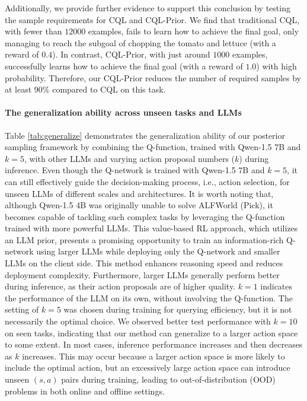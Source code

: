 \documentclass{article} %
\theoremstyle{plain}
\theoremstyle{definition}
\theoremstyle{remark}
\begin{document}
{Additionally, we provide further evidence to support this conclusion by testing the sample requirements for CQL and CQL-Prior. We find that traditional CQL, with fewer than $12000$ examples, fails to learn how to achieve the final goal, only managing to reach the subgoal of chopping the tomato and lettuce (with a reward of $0.4$). In contrast, CQL-Prior, with just around $1000$ examples, successfully learns how to achieve the final goal (with a reward of $1.0$) with high probability. Therefore, our CQL-Prior reduces the number of required samples by at least 90\% compared to CQL on this task.
\paragraph{The generalization ability across unseen tasks and LLMs} Table \ref{tab:generalize} demonstrates the generalization ability of our posterior sampling framework by combining the Q-function, trained with Qwen-1.5 7B and $k=5$, with other LLMs and varying action proposal numbers ($k$) during inference. Even though the Q-network is trained with Qwen-1.5 7B and $k=5$, it can still effectively guide the decision-making process, i.e., action selection, for unseen LLMs of different scales and architectures. It is worth noting that, although Qwen-1.5 4B was originally unable to solve ALFWorld (Pick), it becomes capable of tackling such complex tasks by leveraging the Q-function trained with more powerful LLMs. This value-based RL approach, which utilizes an LLM prior, presents a promising opportunity to train an information-rich Q-network using larger LLMs while deploying only the Q-network and smaller LLMs on the client side. This method enhances reasoning speed and reduces deployment complexity. Furthermore, larger LLMs generally perform better during inference, as their action proposals are of higher quality. $k=1$ indicates the performance of the LLM on its own, without involving the Q-function. The setting of $k=5$ was chosen during training for querying efficiency, but it is not necessarily the optimal choice. We observed better test performance with $k=10$ on seen tasks, indicating that our method can generalize to a larger action space to some extent. In most cases, inference performance increases and then decreases as $k$ increases. This may occur because a larger action space is more likely to include the optimal action, but an excessively large action space can introduce unseen $(s, a)$ pairs during training, leading to out-of-distribution (OOD) problems in both online and offline settings.
  


}
\end{document}
